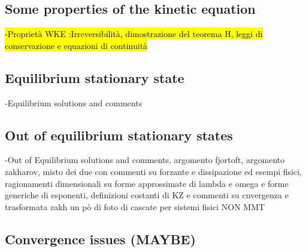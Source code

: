 \subsection{Some properties of the kinetic equation}

\hl{-Proprietà WKE :Irreversibilità, dimostrazione del teorema H, leggi di conservazione e equazioni di continuità}

\subsection{Equilibrium stationary state}

-Equilibrium solutions and comments 

\subsection{Out of equilibrium stationary states}

-Out of Equilibrium solutions and comments, argomento fjortoft, argomento zakharov, misto dei due con commenti su forzante e dissipazione 
ed esempi fisici, ragionamenti dimensionali su forme approssimate di lambda e omega e forme generiche di esponenti, definizioni costanti di KZ e commenti su cnvergenza e 
trasformata zakh un pò di foto di cascate per sistemi fisici NON MMT

\subsection{Convergence issues (MAYBE)}